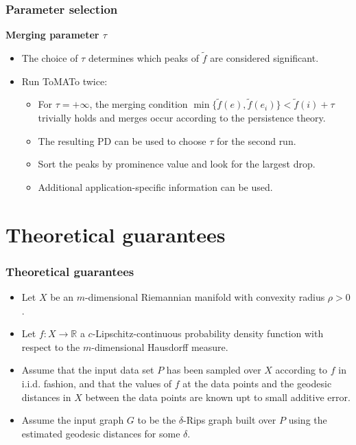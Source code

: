 \documentclass{beamer}
\theoremstyle{definition}
\newcommand{\R}{\mathbb{R}}
\begin{document}
\begin{frame}
\frametitle{Parameter selection}
\textbf{Merging parameter $\tau$}
\begin{itemize}
\item<1-> The choice of $\tau$ determines which peaks of $\tilde{f}$ are considered significant. %
\item<2-> Run ToMATo twice: 
\begin{itemize}
\item<3-> For $\tau=+\infty$, the merging condition $\min\{\tilde{f}(e),\tilde{f}(e_i)\}<\tilde{f}(i)+\tau$ trivially holds and merges occur according to the persistence theory.
\item<4-> The resulting PD can be used to choose $\tau$ for the second run.
\item<5-> Sort the peaks by prominence value and look for the largest drop. %
\item<6-> Additional application-specific information can be used.
\end{itemize}
\end{itemize}
\end{frame}


\section{Theoretical guarantees}
\begin{frame}
\frametitle{Theoretical guarantees}
\begin{itemize}
\item<1-> Let $X$ be an $m$-dimensional Riemannian manifold with convexity radius $\rho>0$.
\item<2-> Let $f : X \to \R$ a $c$-Lipschitz-continuous probability density function with respect to the $m$-dimensional Hausdorff measure. 
\item<3-> Assume that the input data set $P$ has been sampled over $X$ according to $f$ in i.i.d. fashion, and that the values of $f$ at the data points and the geodesic distances in $X$ between the data points are known upt to small additive error. 
\item<4-> Assume the input graph $G$ to be the $\delta$-Rips graph built over $P$ using the estimated geodesic distances for some $\delta$.
\end{itemize}
\end{frame}
\end{document}
